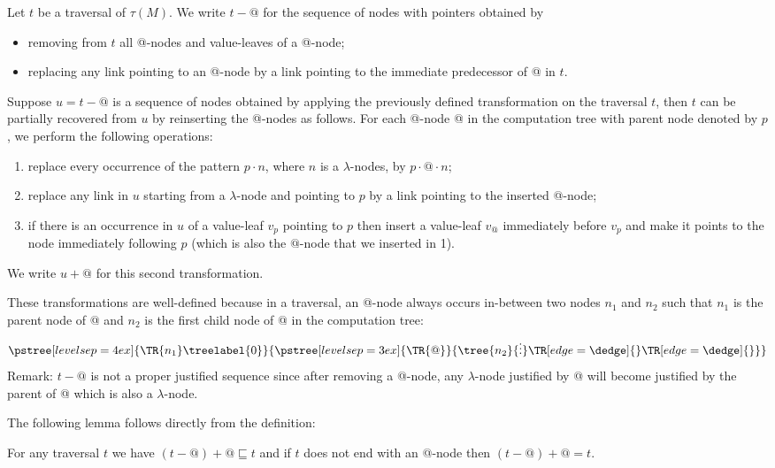 \begin{dfn}
\label{dfn:appnode_filter}
Let $t$ be a traversal of $\tau(M)$.
We write $t-@$ for the sequence of nodes with pointers obtained by
\begin{itemize}
\item removing from $t$ all @-nodes and value-leaves of a @-node;
\item replacing any link pointing to an @-node by a link pointing to the immediate predecessor of @ in $t$.
\end{itemize}

Suppose $u = t-@$ is a sequence of nodes obtained by applying the
previously defined transformation on the traversal $t$, then $t$ can
be partially recovered from $u$ by reinserting the @-nodes as
follows. For each @-node @ in the computation tree with parent node
denoted by $p$, we perform the following operations:
\begin{enumerate}
\item replace every occurrence of the pattern $p \cdot n$, where $n$ is a $\lambda$-nodes,
by $p \cdot @ \cdot n$;
\item replace any link in $u$ starting from a $\lambda$-node and pointing to $p$ by a link pointing to the inserted @-node;
\item if there is an occurrence in $u$ of a value-leaf $v_p$ pointing to $p$ then insert a value-leaf $v_@$
immediately before $v_p$ and make it points to the node immediately
following $p$ (which is also the $@$-node that we inserted in 1).
\end{enumerate}
We write $u+@$ for this second transformation.
\end{dfn}
These transformations are well-defined because in a traversal, an @-node
always occurs in-between two nodes $n_1$ and $n_2$ such that  $n_1$ is the parent node of @
and $n_2$ is the first child node of @ in the computation tree:
$$      \pstree[levelsep=4ex]{\TR{n_1}\treelabel{0} }
        {
            \pstree[levelsep=3ex]{\TR{@}}
            {
                \tree{n_2}{\vdots}
                \TR[edge=\dedge]{}
                \TR[edge=\dedge]{}
            }
        }
$$
Remark: $t-@$ is not a proper justified sequence
since after removing a @-node, any $\lambda$-node justified by @ will become
justified by the parent of @ which is also a $\lambda$-node.

The following lemma follows directly from the definition:
\begin{lem}
\label{lem:minus_at_plus_at}
For any traversal $t$ we have $(t-@)+@ \sqsubseteq t$ and if $t$ does not end with an @-node then
$(t-@)+@ = t$.
\end{lem}

